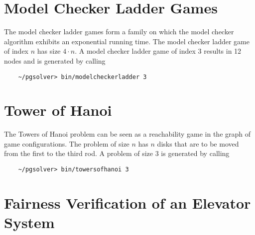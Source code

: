 


\section{Model Checker Ladder Games}

The model checker ladder games form a family on which the model checker algorithm exhibits an
exponential running time.  The model checker ladder game of index $n$ has size $4 \cdot n$. 
A model checker ladder game of index 3 results in 12 nodes and is generated by calling
\begin{verbatim}
    ~/pgsolver> bin/modelcheckerladder 3
\end{verbatim}




\section{Tower of Hanoi}

The Towers of Hanoi problem can be seen as a reachability game in the graph of game configurations.
The problem of size $n$ has $n$ disks that are to be moved from the first to the third rod.
A problem of size $3$ is generated by calling
\begin{verbatim}
    ~/pgsolver> bin/towersofhanoi 3
\end{verbatim}


\section{Fairness Verification of an Elevator System}

